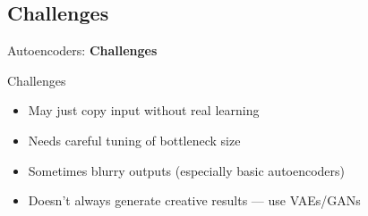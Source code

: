 \subsection{Challenges}
\begin{frame}{}
    \LARGE Autoencoders: \textbf{Challenges}
\end{frame}

\begin{frame}{Challenges}
    \begin{itemize}
        \item May just copy input without real learning
        \item Needs careful tuning of bottleneck size
        \item Sometimes blurry outputs (especially basic autoencoders)
        \item Doesn’t always generate creative results — use VAEs/GANs
    \end{itemize}
\end{frame}